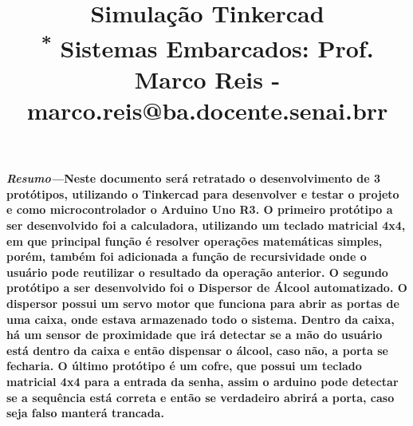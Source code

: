 \documentclass[conference]{IEEEtran}
\begin{document}
\title{Simulação Tinkercad\\
{\footnotesize \textsuperscript{*} Sistemas Embarcados: Prof. Marco Reis - marco.reis@ba.docente.senai.brr}

}



\author{
\and

}

\maketitle

\begin{Resumo}
  \textbf{\textit{Resumo—}Neste documento será retratado o desenvolvimento de 3 protótipos,
  utilizando o Tinkercad para desenvolver e testar o projeto
  e como microcontrolador o Arduino Uno R3. O primeiro
  protótipo a ser desenvolvido foi a calculadora, utilizando um
  teclado matricial 4x4, em que principal função é resolver
  operações matemáticas simples, porém, também foi adicionada
  a função de recursividade onde o usuário pode reutilizar o
  resultado da operação anterior. O segundo protótipo a ser
  desenvolvido foi o Dispersor de Álcool automatizado. 
  O dispersor possui um servo motor que funciona para
  abrir as portas de uma caixa, onde estava armazenado todo o
  sistema. Dentro da caixa, há um sensor de proximidade que
  irá detectar se a mão do usuário está dentro da caixa e então
  dispensar o álcool, caso não, a porta se fecharia. O último
  protótipo é um cofre, que possui um teclado matricial 4x4
  para a entrada da senha, assim o arduino pode detectar se a
  sequência está correta e então se verdadeiro abrirá a porta,
  caso seja falso manterá trancada.}

\end{Resumo}
\end{document}
